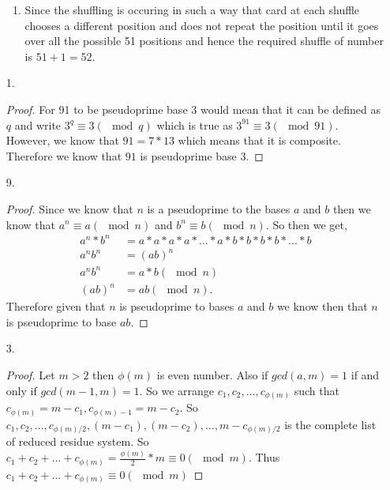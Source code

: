 \documentclass{article}
\theoremstyle{definition}
\begin{document}
\begin{enumerate}
\begin{enumerate}
        \item
        
        Since the shuffling is occuring in such a way that card at each shuffle chooses a different position and does not repeat the position until it goes over all the possible 51 positions and hence the required shuffle of number is $51 + 1 = 52.$
        
    \end{enumerate}
    
     \item [1. ]
    
    \begin{proof}
    For 91 to be pseudoprime base 3 would mean that it can be defined as $q$ and write $3^q \equiv 3 (\mod q)$ which is true as $3^91 \equiv 3 (\mod 91)$. However, we know that $91 = 7*13$ which means that it is composite. Therefore we know that $91$ is pseudoprime base 3.
    \end{proof}
    
     \item [9. ]
    
    \begin{proof}
    Since we know that $n$ is a pseudoprime to the bases $a$ and $b$ then we know that $a^n \equiv a (\mod n)$ and $b^n \equiv b (\mod n)$. So then we get,
    \begin{align*}
        a^n*b^n &= a*a*a*a*...*a*b*b*b*b*...*b\\
        a^n b^n &= (ab)^n\\
        a^nb^n &= a*b(\mod n)\\
        (ab)^n &= ab(\mod n).
    \end{align*} Therefore given that $n$ is pseudoprime to bases $a$ and $b$ we know then that $n$ is pseudoprime to base $ab.$
    \end{proof}
    
     \item [3. ]
    
    \begin{proof}
    Let $m > 2$ then $\phi(m)$ is even number. Also if $gcd(a, m) = 1$ if and only if $gcd(m-1, m) = 1$. So we arrange $c_1, c_2, ..., c_{\phi(m)}$ such that $c_{\phi(m)} = m - c_1, c_{\phi(m)-1} = m-c_2.$ So $c_1, c_2, ..., c_{\phi(m)/2}, (m-c_1), (m-c_2), ..., m - c_{\phi(m)/2}$ is the complete list of reduced residue system. So $c_1+ c_2 + ... + c_{\phi(m)} = \frac{\phi(m)}{2}*m \equiv 0 (\mod m).$ Thus $c_1 + c_2 + ... + c_{\phi(m)} \equiv 0 (\mod m)$ \end{proof}
    

\end{enumerate}
\end{document}
